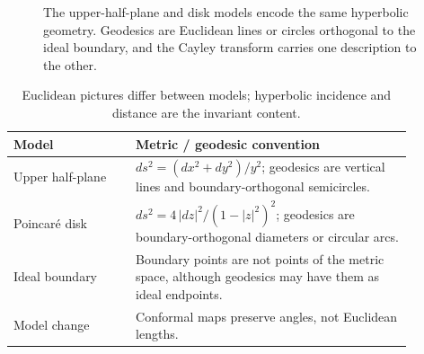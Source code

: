 \begin{figure}[htbp]
\centering
{}
\caption{The upper-half-plane and disk models encode the same hyperbolic geometry.
Geodesics are Euclidean lines or circles orthogonal to the ideal boundary, and the
Cayley transform carries one description to the other.}
\label{fig:vii31-c07-hyperbolic-models}
\end{figure}

\begin{table}[htbp]
\centering\small
\begin{tabular}{p{0.27\linewidth}p{0.61\linewidth}}
\toprule
Model & Metric / geodesic convention\\
\midrule
Upper half-plane & $ds^2=(dx^2+dy^2)/y^2$; geodesics are vertical lines and boundary-orthogonal semicircles.\\
Poincar\'e disk & $ds^2=4\,|dz|^2/(1-|z|^2)^2$; geodesics are boundary-orthogonal diameters or circular arcs.\\
Ideal boundary & Boundary points are not points of the metric space, although geodesics may have them as ideal endpoints.\\
Model change & Conformal maps preserve angles, not Euclidean lengths.\\
\bottomrule
\end{tabular}
\caption{Euclidean pictures differ between models; hyperbolic incidence and distance are the invariant content.}
\label{tab:vii31-c07-hyperbolic-conventions}
\end{table}
